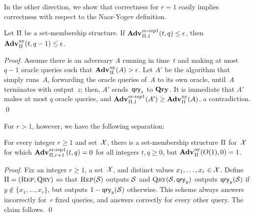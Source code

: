 In the other direction, we show that correctness for $r=1$
easily implies correctness with respect to the Naor-Yogev
definition.
\begin{theorem}
  Let $\mathrm{\Pi}$ be a set-membership structure.
  If $\Adv{\errepone}_{\struct,1}(t,q) \leq \epsilon$, then
  $\Adv{\ny}_{\struct}(t,q-1) \leq \epsilon$.
\end{theorem}
\begin{proof}
  Assume there is an adversary $A$ running in time~$t$ and making at most $q-1$
  oracle queries such that $\Adv{\ny}_{\Pi}(A) > \epsilon$.
  Let $A'$ be the algorithm that simply runs~$A$, forwarding the oracle queries
  of~$A$ to its own oracle, until~$A$ terminates with output~$z$; then, $A'$
  sends~$\mathsf{qry}_z$ to $\mathbf{Qry}\hspace{0.5pt}$.
  It is immediate that $A'$ makes at most $q$ oracle queries, and
  $\Adv{\errepone}_{\struct,1}(A') \geq \Adv{\ny}_{\struct}(A)$, a contradiction.
  \hfill\qed
\end{proof}
%
For $r > 1$, however, we have the following separation:
\begin{theorem}
  For every integer $r \geq 1$ and set~$\mathcal{X}$, there is a set-membership structure
  $\mathrm{\Pi}$ for~$\mathcal{X}$ for which
  $\Adv{\errepone}_{\struct,r+1}(t,q)=0$ for all integers $t, q \geq 0$, but
  $\Adv{\ny}_{\struct}(O(1),0) = 1$.
\end{theorem}
\begin{proof}
  Fix an integer $r \geq 1$, a set~$\mathcal{X}$, and distinct values $x_1, \ldots,
  x_r \in \mathcal{X}$.
  Define $\mathrm{\Pi} = (\textsc{Rep}, \textsc{Qry})$ so that $\textsc{Rep}(\mathcal{S})$ outputs
  $\mathcal{S}$ and $\textsc{Qry}(\mathcal{S}, \mathsf{qry}_y)$ outputs $\mathsf{qry}_y(\mathcal{S})$ if
  $y \notin \{ x_1, \ldots, x_r \}$, but outputs $1-\mathsf{qry}_y(\mathcal{S})$ otherwise.
  This scheme always answers incorrectly for~$r$ fixed queries, and answers
  correctly for every other query.
  The claim follows.
  \hfill\qed
\end{proof}

